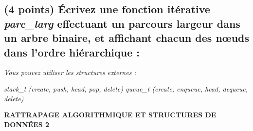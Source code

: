 \documentclass[11pt,a4paper]{article}
\begin{document}
\clearpage

\subsection{(4 points) \'Ecrivez une fonction itérative \og \textit{parc\_larg} \fg{} effectuant un parcours largeur dans un arbre binaire, et affichant chacun des nœuds dans l'ordre hiérarchique : }



\noindent \textit{Vous pouvez utiliser les structures externes :}

\noindent \textit{stack\_t (create, push, head, pop, delete) \hfill queue\_t (create, enqueue, head, dequeue, delete) }

\begin{center}
\end{center}



\clearpage



\vfillFirst

\begin{center}

\begin{LARGE}
\textbf{RATTRAPAGE ALGORITHMIQUE ET STRUCTURES DE DONN\'EES 2}
\end{LARGE}

\end{center}

\vfillLast
\end{document}
